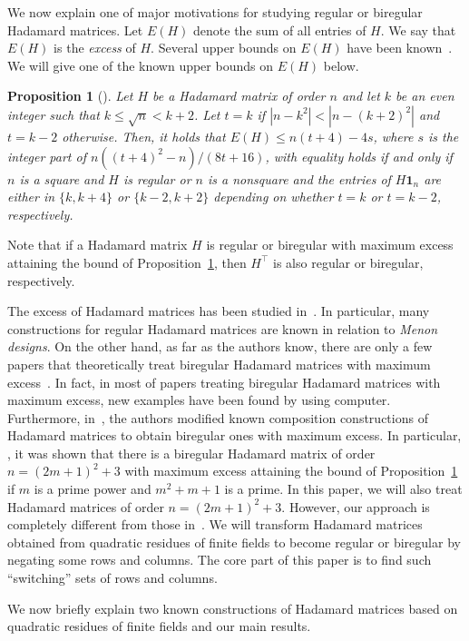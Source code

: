 \documentclass[10pt]{amsart}
\newtheorem{prop}[theo]{Proposition}
\theoremstyle{definition}
\newcommand*\tra{\top}
\newcommand*{\un}{\mathbf{1}}
\begin{document}
We now explain one of major motivations for studying regular or biregular Hadamard matrices. Let $E(H)$ denote the sum of all entries of $H$. We say that $E(H)$ is the \emph{excess} of $H$. Several upper bounds on $E(H)$ have been known~\cite{B,HLS,KF}. We will give one of the known upper bounds on $E(H)$ below.

\begin{prop}[\cite{HLS}] \label{prop:Hadabound}
Let $H$ be a Hadamard matrix of order $n$ and let $k$ be an even integer such that $k\le \sqrt{n}<k+2$. Let $t=k$ if $|n-k^2|<|n-(k+2)^2|$ and $t=k-2$ otherwise. Then, it holds that $E(H)\leq n(t+4)-4s$, where $s$ is the integer part of $n((t+4)^2-n)/(8t+16)$, with equality holds if and only if $n$ is a square and $H$ is regular or $n$ is a nonsquare and the entries of $H\un_n$ are either in $\{k,k+4\}$ or $\{k-2,k+2\}$ depending on whether $t=k$ or $t=k-2$, respectively.
\end{prop}

Note that if a Hadamard matrix $H$ is regular or biregular with maximum excess attaining the bound of Proposition~\ref{prop:Hadabound}, then $H^\tra$ is also regular or biregular, respectively.

The excess of Hadamard matrices has been studied in~\cite{B,CK,FK,HK,HKL,K,KK,KKS,KS,KF,S,XXS}. In particular, many constructions for regular Hadamard matrices are known in relation to \emph{Menon designs}. On the other hand, as far as the authors know, there are only a few papers that theoretically treat biregular Hadamard matrices with maximum excess~\cite{K,KKS}. In fact, in most of papers treating biregular Hadamard matrices with maximum excess, new examples have been found by using computer. Furthermore, in~\cite{K,KKS}, the authors modified known composition constructions of Hadamard matrices to obtain biregular ones with maximum excess. In particular, \cite{KKS}, it was shown that there is a biregular Hadamard matrix of order $n=(2m+1)^2+3$ with maximum excess attaining the bound of Proposition~\ref{prop:Hadabound} if $m$ is a prime power and $m^2+m+1$ is a prime. In this paper, we will also treat Hadamard matrices of order $n=(2m+1)^2+3$. However, our approach is completely different from those in~\cite{K,KKS}. We will transform Hadamard matrices obtained from quadratic residues of finite fields to become regular or biregular by negating some rows and columns. The core part of this paper is to find such ``switching'' sets of rows and columns.

We now briefly explain two known constructions of Hadamard matrices based on quadratic residues of finite fields and our main results.
\end{document}

